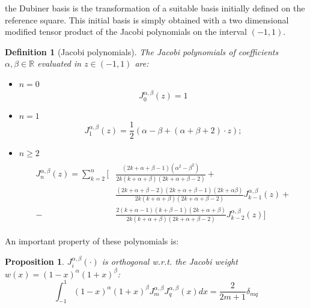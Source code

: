 \documentclass[a4paper,11pt]{article}
\newtheorem{definition}{Definition}
\newtheorem{prop}{Proposition}
\begin{document}
    \noindent the Dubiner basis is the transformation of a suitable basis initially defined on the reference square. This initial basis is simply obtained with a two dimensional modified tensor product of the Jacobi polynomials on the interval $(-1,1)$.
    \begin{definition}[Jacobi polynomials]
    The Jacobi polynomials of coefficients $\alpha,\beta \in \mathbb{R}$ evaluated in $z\in (-1,1)$ are:
    \begin{itemize}[label=\textendash]
    \item $n=0$
    \begin{equation}
    J_0^{\alpha,\beta}(z)=1
    \end{equation}
    \item $n=1$
    \begin{equation}
    J_1^{\alpha,\beta}(z)=\frac{1}{2}(\alpha-\beta+(\alpha+\beta+2)\cdot z);
    \end{equation}
    \item $n\ge2$
    \newline
    \begin{equation}
    \begin{gathered}
    \begin{aligned}
    J_n^{\alpha,\beta}(z)=\sum_{k=2}^{n} \Big[&\frac{(2k+\alpha+\beta-1)(\alpha^{2}-\beta^{2})}{2k(k+\alpha+\beta)(2k+\alpha+\beta-2)}+ \\ &\frac{(2k+\alpha+\beta-2)(2k+\alpha+\beta-1)(2k+\alpha \beta)}{2k(k+\alpha+\beta)(2k+\alpha+\beta-2)} J_{k-1}^{\alpha,\beta}(z) +
    \\-&\frac{2(k+\alpha-1)(k+\beta-1)(2k+\alpha+\beta)}{2k(k+\alpha+\beta)(2k+\alpha+\beta-2)} J_{k-2}^{\alpha,\beta}(z) \Big]
    \end{aligned}
    \end{gathered}
    \end{equation}
    \end{itemize}
    \end{definition}
    \vspace{5mm}
    \noindent An important property of these polynomials is:
    \begin{prop}
    $J_i^{\alpha,\beta}(\cdot)$ is orthogonal w.r.t. the Jacobi weight $w(x)=(1-x)^\alpha(1+x)^\beta$:
    \begin{equation}
    \int_{-1}^{1}{(1-x)^\alpha(1+x)^\beta J_m^{\alpha,\beta} J_q^{\alpha,\beta}(x)dx}=\frac{2}{2m+1} \delta_{mq} 
    \end{equation}
    \end{prop}
    
\end{document}
